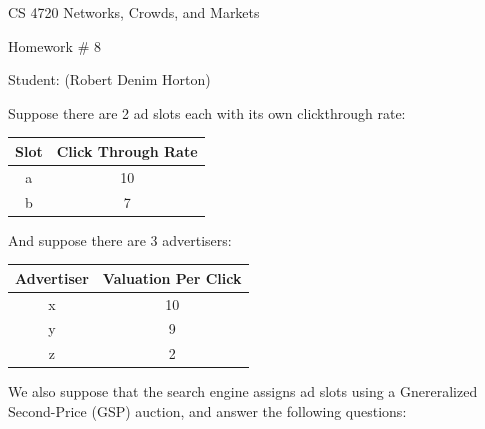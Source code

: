 \documentclass[11pt]{article}
\begin{document}
 

\rhead{\today}

\begin{center}\begin{Large}
CS 4720 Networks, Crowds, and Markets

Homework \#  8

Student: (Robert Denim Horton)
\end{Large}
\end{center}

Suppose there are 2 ad slots each with its own clickthrough rate: 
\begin{center}
	\begin{tabular}{ |c|c|} 
		 \hline
		 Slot & Click Through Rate \\ 
		 \hline\hline
		 a & 10 \\ 
		 \hline
		 b & 7 \\ 
 		\hline
	\end{tabular}
\end{center}
And suppose there are 3 advertisers:
\begin{center}
	\begin{tabular}{ |c|c| } 
		 \hline
		 Advertiser & Valuation Per Click \\ 
		 \hline\hline
		 x & 10 \\
		 \hline 
		 y & 9 \\
		 \hline
		z & 2 \\ 
		 \hline
	\end{tabular}
\end{center}
We also suppose that the search engine assigns ad slots using a Gnereralized Second-Price (GSP) auction, and answer the following questions:
\end{document}
